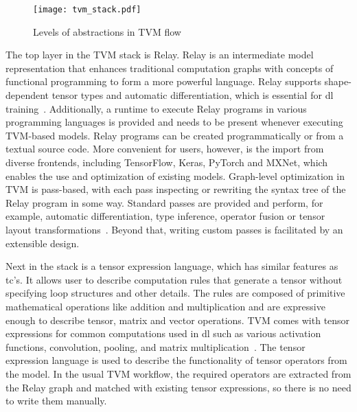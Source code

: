 \begin{figure}
	\centering
	\texttt{[image: tvm\_stack.pdf]}%
	\caption{Levels of abstractions in TVM flow}
	\label{fig:tvm-stack}
\end{figure}

The top layer in the TVM stack is Relay. Relay is an intermediate model representation that enhances traditional computation graphs with concepts of functional programming to form a more powerful language. Relay supports shape-dependent tensor types and automatic differentiation, which is essential for \gls{dl} training~\cite[p.~61]{Roesch.2018}.  Additionally, a runtime to execute Relay programs in various programming languages is provided and needs to be present whenever executing TVM-based models. Relay programs can be created programmatically or from a textual source code. More convenient for users, however, is the import from diverse frontends, including TensorFlow, Keras, PyTorch and MXNet, which enables the use and optimization of existing models. Graph-level optimization in TVM is pass-based, with each pass inspecting or rewriting the syntax tree of the Relay program in some way. Standard passes are provided and perform, for example, automatic differentiation, type inference, operator fusion or tensor layout transformations~\cite[p.~3]{Chen.2018b}. Beyond that, writing custom passes is facilitated by an extensible design.

Next in the stack is a tensor expression language, which has similar features as \gls{tc}'s. It allows user to describe computation rules that generate a tensor without specifying loop structures and other details. The rules are composed of primitive mathematical operations like addition and multiplication and are expressive enough to describe tensor, matrix and vector operations. TVM comes with tensor expressions for common computations used in \gls{dl} such as various activation functions, convolution, pooling, and matrix multiplication~\cite[p.~4~f.]{Chen.2018b}. The tensor expression language is used to describe the functionality of tensor operators from the model. In the usual TVM workflow, the required operators are extracted from the Relay graph and matched with existing tensor expressions, so there is no need to write them manually.

